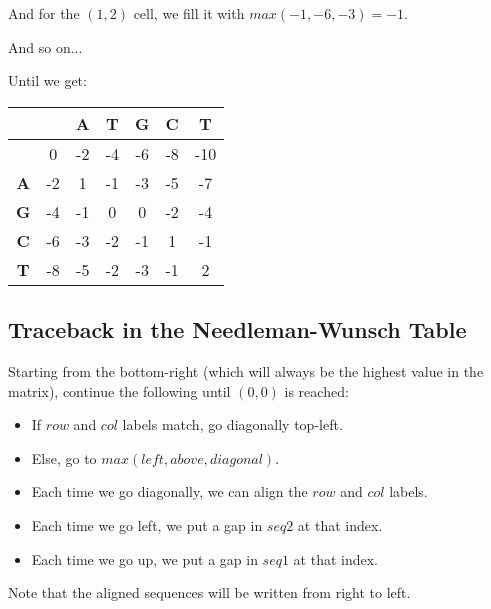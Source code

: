 And for the $(1,2)$ cell, we fill it with $max(-1,-6,-3) = -1$.

And so on...

Until we get:

\begin{table}[htbp]
    \centering
    \begin{tabular}{|c|c|c|c|c|c|c|}
        \hline
          &  & \textbf{A} & \textbf{T} & \textbf{G} & \textbf{C} & \textbf{T} \\
        \hline
        & 0 & -2 & -4 & -6 & -8 & -10 \\
        \hline
        \textbf{A} & -2 & 1 & -1 & -3 & -5 & -7 \\
        \hline
        \textbf{G} & -4 & -1 & 0 & 0 & -2 & -4 \\
        \hline
        \textbf{C} & -6 & -3 & -2 & -1 & 1 & -1 \\
        \hline
        \textbf{T} & -8 & -5 & -2 & -3 & -1 & 2 \\
        \hline
    \end{tabular}
\end{table}

\subsection{Traceback in the Needleman-Wunsch Table}

Starting from the bottom-right (which will always be the highest value in the matrix),
continue the following until $(0,0)$ is reached:

\begin{itemize}
    \item If $row$ and $col$ labels match, go diagonally top-left.

    \item Else, go to $max(left,above,diagonal)$.
    
    \item Each time we go diagonally, we can align the $row$ and $col$ labels.

    \item Each time we go left, we put a gap in $seq2$ at that index.

    \item Each time we go up, we put a gap in $seq1$ at that index.

\end{itemize}

Note that the aligned sequences will be written from right to left.


